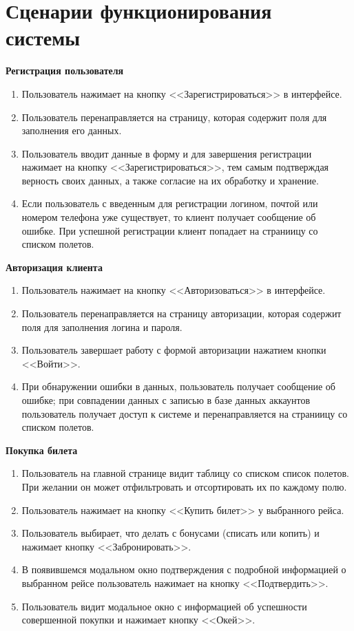 \clearpage
\section{Сценарии функционирования системы}

\textbf{Регистрация пользователя}
\begin{enumerate}
	\item Пользователь нажимает на кнопку <<Зарегистрироваться>> в интерфейсе.
	\item Пользователь перенаправляется на страницу, которая содержит поля для заполнения его данных.
	\item Пользователь вводит данные в форму и для завершения регистрации нажимает на кнопку <<Зарегистрироваться>>, тем самым подтверждая верность своих данных, а также согласие на их обработку и хранение.
	\item Если пользователь с введенным для регистрации логином, почтой или номером телефона уже существует, то клиент получает сообщение об ошибке. При успешной регистрации клиент попадает на страниицу со списком полетов.
\end{enumerate}

\textbf{Авторизация клиента}
\begin{enumerate}
	\item Пользователь нажимает на кнопку <<Авторизоваться>> в интерфейсе.
	\item Пользователь перенаправляется на страницу авторизации, которая содержит поля для заполнения логина и пароля.
	\item Пользователь завершает работу с формой авторизации нажатием кнопки <<Войти>>.
	\item При обнаружении ошибки в данных, пользователь получает сообщение об ошибке; при совпадении данных с записью в базе данных аккаунтов пользователь получает доступ к системе и перенаправляется на страниицу со списком полетов.
\end{enumerate}

\textbf{Покупка билета}
\begin{enumerate}
	\item Пользователь на главной странице видит таблицу со списком список полетов. При желании он может отфильтровать и отсортировать их по каждому полю.
	\item Пользователь нажимает на кнопку <<Купить билет>> у выбранного рейса.
  \item Пользователь выбирает, что делать с бонусами (списать или копить) и нажимает кнопку <<Забронировать>>.
  \item В появившемся модальном окно подтверждения с подробной информацией о выбранном рейсе пользователь нажимает на кнопку <<Подтвердить>>.
	\item Пользователь видит модальное окно с информацией об успешности совершенной покупки и нажимает кнопку <<Окей>>.
\end{enumerate}

